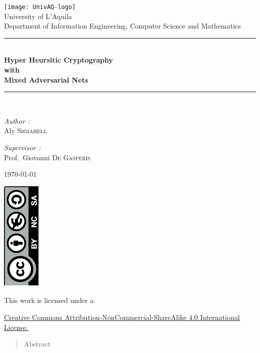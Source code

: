 \documentclass[12pt]{article}
\begin{document}
\begin{titlepage}
	\begin{center}
		\texttt{[image: UnivAQ-logo]}\\[1cm]
		{\large University of L'Aquila}\\[0.5cm]
		{\large Department of Information Engineering, Computer Science and Mathematics}\\[0.5cm]
		\rule{\linewidth}{0.5mm} \\[0.4cm]
		{\huge \bfseries Hyper Heursitic Cryptography\\
			with\\
			Mixed Adversarial Nets \\[0.4cm] }
		\rule{\linewidth}{0.5mm} \\[1.5cm]
		\noindent
		\begin{minipage}{0.4\textwidth}
			\begin{flushleft}
				\large
				\emph{Author :}\\
				Aly \textsc{Shmahell}
			\end{flushleft}
		\end{minipage}%
		\begin{minipage}{0.4\textwidth}
			\begin{flushleft}
				\large
				\emph{Supervisor :} \\
				Prof.~Giovanni \textsc{De Gasperis}\\
			\end{flushleft}
		\end{minipage}
		\vfill
		\today
	\end{center}
\end{titlepage}
\begin{titlepage}
		\begin{center}
			\includegraphics[angle=-90]{by-nc-sa}
		\end{center}
			\begin{center}
				This work is licensed under a
			\end{center}
			\begin{center}
				 \href{http://creativecommons.org/licenses/by-nc-sa/4.0/}{Creative Commons Attribution-NonCommercial-ShareAlike 4.0 International License.}
			\end{center}
		
\end{titlepage}
\begin{abstract}
Abstract
\end{abstract}
\newpage
\end{document}
